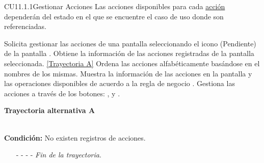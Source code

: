 	\begin{UseCase}{CU11.1.1}{Gestionar Acciones}{
     	Las acciones disponibles para cada \hyperlink{EntidadAccion}{acción} dependerán del estado en el que se encuentre el caso de uso donde son referenciadas. 
	}
	
\end{UseCase}
\begin{UCtrayectoria}
	\UCpaso[\UCactor] Solicita gestionar las acciones de una pantalla seleccionando el icono (Pendiente) de la pantalla .
	\UCpaso[\UCsist] Obtiene la información de las acciones registradas de la pantalla seleccionada. \hyperlink{CU11-1-1:TAA}{[Trayectoria A]}
	\UCpaso[\UCsist] Ordena las acciones alfabéticamente basándose en el nombres de los mismas.
	\UCpaso[\UCsist] Muestra la información de las acciones en la pantalla  y las operaciones disponibles de acuerdo a la regla de negocio . \label{CU11-1-1-P4}
	\UCpaso[\UCactor] Gestiona las acciones a través de los botones: , \editar y \eliminar. 
\end{UCtrayectoria}		
\hypertarget{CU11-1-1:TAA}{\textbf{Trayectoria alternativa A}}\\
\noindent \textbf{Condición:} No existen registros de acciones.
\begin{enumerate}
	\UCpaso[\UCsist] Muestra el mensaje  en la pantalla  para indicar que no hay registros de acciones para mostrar.  \label{CU11-1-1-TA1}
	\UCpaso[\UCactor] Gestiona las acciones a través del botón: . 
	\item[- -] - - {\em {Fin de la trayectoria}}.%
\end{enumerate}
